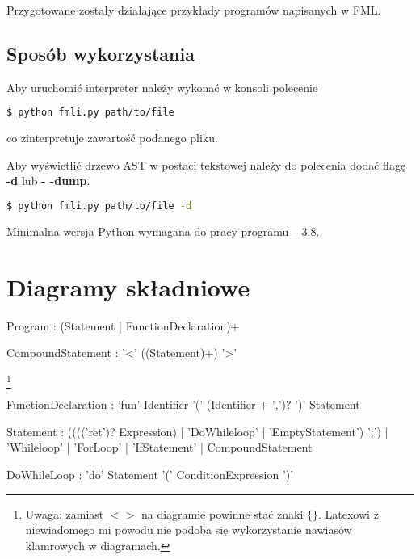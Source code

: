 \documentclass[12pt,a4paper]{article}
\begin{document}
Przygotowane zostały działające przykłady programów napisanych w FML.

\subsection{Sposób wykorzystania}

Aby uruchomić interpreter należy wykonać w konsoli polecenie

\begin{lstlisting}[language=bash]
  $ python fmli.py path/to/file
\end{lstlisting}

\noindent co zinterpretuje zawartość podanego pliku.

\smallbreak

Aby wyświetlić drzewo AST w postaci tekstowej należy do polecenia dodać flagę \textbf{-d} lub \textbf{- -dump}.

\begin{lstlisting}[language=bash]
  $ python fmli.py path/to/file -d
\end{lstlisting}

Minimalna wersja Python wymagana do pracy programu -- 3.8. 


\section{Diagramy składniowe}

\begin{rail}
Program : (Statement | FunctionDeclaration)+
\end{rail}

\begin{rail}
CompoundStatement : '<' ((Statement)+) '>'
\end{rail} \footnote{Uwaga: zamiast \textbf{$< >$} na diagramie powinne stać znaki \textbf{$\{ \}$}. Latexowi z niewiadomego mi powodu nie podoba się wykorzystanie nawiasów klamrowych w diagramach.}

\begin{rail}
FunctionDeclaration : 'fun' Identifier '(' (Identifier + ',')?  ')' Statement
\end{rail}

\begin{rail}
Statement : (((('ret')? Expression) | 'DoWhileloop' | 'EmptyStatement') ';') | 'Whileloop' | 'ForLoop' | 'IfStatement' | CompoundStatement
\end{rail}

\begin{rail}
DoWhileLoop : 'do' Statement '(' ConditionExpression ')'
\end{rail}
\end{document}
